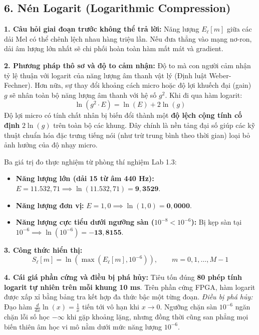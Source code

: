 \documentclass[11pt,a4paper]{article}
\begin{document}
\subsection*{6. Nén Logarit (Logarithmic Compression)}

\textbf{1. Câu hỏi giai đoạn trước không thể trả lời:} Năng lượng $E_\ell[m]$ giữa các dải Mel có thể chênh lệch nhau hàng triệu lần. Nếu đưa thẳng vào mạng nơ-ron, dải âm lượng lớn nhất sẽ chi phối hoàn toàn hàm mất mát và gradient.

\textbf{2. Phương pháp thô sơ và độ to cảm nhận:} Độ to mà con người cảm nhận tỷ lệ thuận với logarit của năng lượng âm thanh vật lý (Định luật Weber-Fechner). Hơn nữa, sự thay đổi khoảng cách micro hoặc độ lợi khuếch đại (gain) $g$ sẽ nhân toàn bộ năng lượng âm thanh với hệ số $g^2$. Khi đi qua hàm logarit:
\[
\ln(g^2 \cdot E) = \ln(E) + 2\ln(g)
\]
Độ lợi micro có tính chất nhân bị biến đổi thành một \textbf{độ lệch cộng tính cố định} $2\ln(g)$ trên toàn bộ các khung. Đây chính là nền tảng đại số giúp các kỹ thuật chuẩn hóa đặc trưng tiếng nói (như trừ trung bình theo thời gian) loại bỏ ảnh hưởng của độ nhạy micro.

Ba giá trị đo thực nghiệm từ phòng thí nghiệm Lab 1.3:
\begin{itemize}
    \setlength{\itemsep}{0pt}
    \item \textbf{Năng lượng lớn (dải 15 từ âm 440 Hz):} $E = 11.532{,}71 \implies \ln(11.532{,}71) = \mathbf{9{,}3529}$.
    \item \textbf{Năng lượng đơn vị:} $E = 1{,}0 \implies \ln(1{,}0) = \mathbf{0{,}0000}$.
    \item \textbf{Năng lượng cực tiểu dưới ngưỡng sàn ($10^{-8} < 10^{-6}$):} Bị kẹp sàn tại $10^{-6} \implies \ln(10^{-6}) = \mathbf{-13{,}8155}$.
\end{itemize}

\textbf{3. Công thức hiển thị:}
\[
S_\ell[m] = \ln(\max(E_\ell[m], 10^{-6})), \qquad m = 0, 1, \dots, M-1
\]

\textbf{4. Cái giá phần cứng và điều bị phá hủy:} Tiêu tốn đúng \textbf{80 phép tính logarit tự nhiên trên mỗi khung 10 ms}. Trên phần cứng FPGA, hàm logarit được xấp xỉ bằng bảng tra kết hợp đa thức bậc một từng đoạn. \textit{Điều bị phá hủy:} Đạo hàm $\frac{d}{dx} \ln(x) = \frac{1}{x}$ tiến tới vô hạn khi $x \to 0$. Ngưỡng chặn sàn $10^{-6}$ ngăn chặn lỗi số học $-\infty$ khi gặp khoảng lặng, nhưng đồng thời cũng san phẳng mọi biến thiên âm học vi mô nằm dưới mức năng lượng $10^{-6}$.

\clearpage
\end{document}
